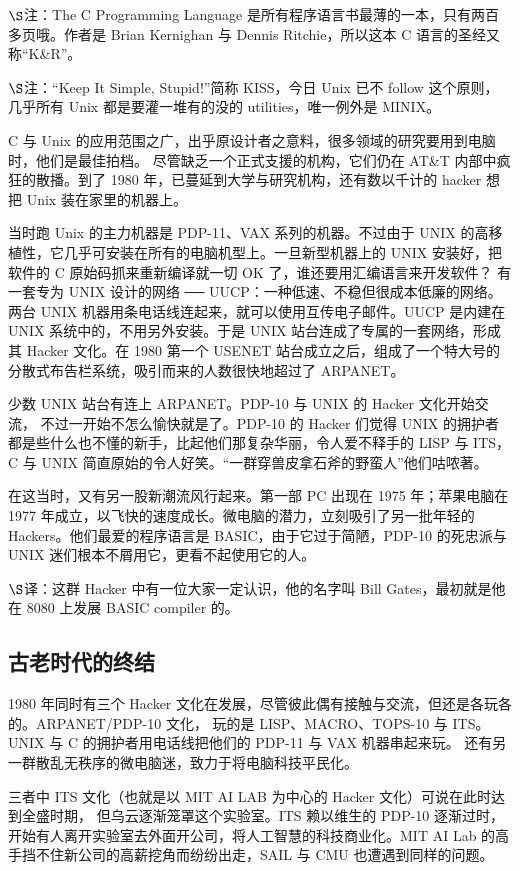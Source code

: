 $\S$注：The C Programming Language 是所有程序语言书最薄的一本，只有两百多页哦。作者是 Brian Kernighan 与 Dennis Ritchie，所以这本 C 语言的圣经又称“K\&R”。

$\S$注：“Keep It Simple, Stupid!”简称 KISS，今日 Unix 已不 follow 这个原则，几乎所有 Unix 都是要灌一堆有的没的 utilities，唯一例外是 MINIX。

C 与 Unix 的应用范围之广，出乎原设计者之意料，很多领域的研究要用到电脑时，他们是最佳拍档。 尽管缺乏一个正式支援的机构，它们仍在 AT\&T 内部中疯狂的散播。到了 1980 年，已蔓延到大学与研究机构，还有数以千计的 hacker 想把 Unix 装在家里的机器上。

当时跑 Unix 的主力机器是 PDP-11、VAX 系列的机器。不过由于 UNIX 的高移植性，它几乎可安装在所有的电脑机型上。一旦新型机器上的 UNIX 安装好，把软件的 C 原始码抓来重新编译就一切 OK 了，谁还要用汇编语言来开发软件？ 有一套专为 UNIX 设计的网络 ── UUCP：一种低速、不稳但很成本低廉的网络。 两台 UNIX 机器用条电话线连起来，就可以使用互传电子邮件。UUCP 是内建在 UNIX 系统中的，不用另外安装。于是 UNIX 站台连成了专属的一套网络，形成其 Hacker 文化。在 1980 第一个 USENET 站台成立之后，组成了一个特大号的分散式布告栏系统，吸引而来的人数很快地超过了 ARPANET。

少数 UNIX 站台有连上 ARPANET。PDP-10 与 UNIX 的 Hacker 文化开始交流， 不过一开始不怎么愉快就是了。PDP-10 的 Hacker 们觉得 UNIX 的拥护者都是些什么也不懂的新手，比起他们那复杂华丽，令人爱不释手的 LISP 与 ITS，C 与 UNIX 简直原始的令人好笑。“一群穿兽皮拿石斧的野蛮人”他们咕哝著。

在这当时，又有另一股新潮流风行起来。第一部 PC 出现在 1975 年；苹果电脑在 1977 年成立，以飞快的速度成长。微电脑的潜力，立刻吸引了另一批年轻的 Hackers。他们最爱的程序语言是 BASIC，由于它过于简陋，PDP-10 的死忠派与 UNIX 迷们根本不屑用它，更看不起使用它的人。

$\S$译：这群 Hacker 中有一位大家一定认识，他的名字叫 Bill Gates，最初就是他在 8080 上发展 BASIC compiler 的。

\subsection{古老时代的终结}

1980 年同时有三个 Hacker 文化在发展，尽管彼此偶有接触与交流，但还是各玩各的。ARPANET/PDP-10 文化， 玩的是 LISP、MACRO、TOPS-10 与 ITS。UNIX 与 C 的拥护者用电话线把他们的 PDP-11 与 VAX 机器串起来玩。 还有另一群散乱无秩序的微电脑迷，致力于将电脑科技平民化。

三者中 ITS 文化（也就是以 MIT AI LAB 为中心的 Hacker 文化）可说在此时达到全盛时期， 但乌云逐渐笼罩这个实验室。ITS 赖以维生的 PDP-10 逐渐过时，开始有人离开实验室去外面开公司，将人工智慧的科技商业化。MIT AI Lab 的高手挡不住新公司的高薪挖角而纷纷出走，SAIL 与 CMU 也遭遇到同样的问题。


